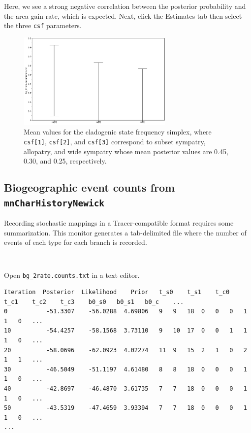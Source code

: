\documentclass[11pt]{article}
\newcommand{\impmark}{\strut\vadjust{\domark}}
\newcommand{\domark}{%
  \vbox to 0pt{
    \kern-\dp\strutbox
    \smash{\llap{$\rightarrow$\kern1em}}
    \vss
  }%
}
\begin{document}
Here, we see a strong negative correlation between the posterior probability and the area gain rate, which is expected.
Next, click the Estimates tab then select the three {\tt csf} parameters.

\begin{figure}[H]
\centering
\includegraphics[width=3in]{figures/clado_freq_posterior}
\caption{Mean values for the cladogenic state frequency simplex, where {\tt csf[1]}, {\tt csf[2]}, and {\tt csf[3]} correspond to subset sympatry, allopatry, and wide sympatry whose mean posterior values are 0.45, 0.30, and 0.25, respectively.}
\end{figure}


\subsection{Biogeographic event counts from {\tt mnCharHistoryNewick}}

Recording stochastic mappings in a Tracer-compatible format requires some summarization.
This monitor generates a tab-delimited file where the number of events of each type for each branch is recorded.

\noindent \\ \impmark Open {\tt bg\_2rate.counts.txt} in a text editor.

\begin{framed}
\begin{lstlisting}[basicstyle=\tiny \listingsfont, columns=texcl]
Iteration  Posterior  Likelihood    Prior	t_s0	t_s1	t_c0	t_c1	t_c2	t_c3	b0_s0	b0_s1	b0_c	...
0           -51.3307    -56.0288  4.69806	9	9	18	0	0	0	1	1	0	...	
10          -54.4257    -58.1568  3.73110	9	10	17	0	0	1	1	1	0	...
20          -58.0696    -62.0923  4.02274	11	9	15	2	1	0	2	1	1	...
30          -46.5049    -51.1197  4.61480	8	8	18	0	0	0	1	1	0	...
40          -42.8697    -46.4870  3.61735	7	7	18	0	0	0	1	1	0	...
50          -43.5319    -47.4659  3.93394	7	7	18	0	0	0	1	1	0	...
...
\end{lstlisting}
\end{framed}
\end{document}
